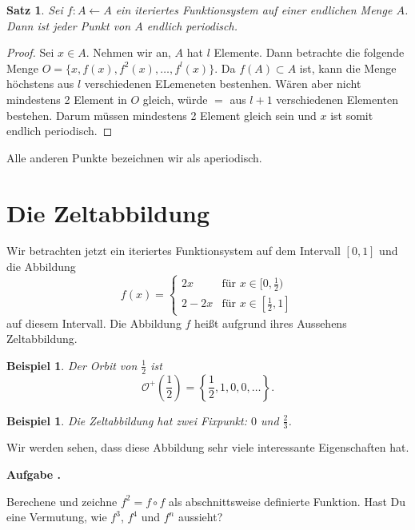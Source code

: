 \documentclass[a4paper,ngerman,12pt]{scrartcl}
\theoremstyle{definition}
\theoremstyle{plain}
\newtheorem{satz}[defn]{Satz}
\newtheorem{beispiel}[defn]{Beispiel}
\theoremstyle{remark}
\newlength{\aufgabenskip}
\newcounter{aufgabennummer}
\newenvironment{aufgabe}[1]{
  \addtocounter{aufgabennummer}{1}
  \textbf{Aufgabe \theaufgabennummer.} \emph{#1} \par
}{\vspace{\aufgabenskip}}
\begin{document}
\begin{satz}
Sei $f:A\longleftarrow A$ ein iteriertes Funktionsystem auf einer endlichen Menge $A$. Dann ist jeder Punkt von $A$ endlich periodisch.
\end{satz}
\begin{proof}
Sei $x\in A$. Nehmen wir an, $A$ hat $l$ Elemente. Dann betrachte die folgende Menge $O = \{x, f(x), f^2(x),\ldots, f^l(x)\}$. Da $f(A)\subset A$ ist, kann die Menge höchstens aus $l$ verschiedenen ELemeneten bestenhen. Wären aber nicht mindestens 2 Element in $O$ gleich, würde $=$ aus $l+1$ verschiedenen Elementen bestehen. Darum müssen mindestens 2 Element gleich sein und $x$ ist somit endlich periodisch.
\end{proof}
Alle anderen Punkte bezeichnen wir als aperiodisch.

\section{Die Zeltabbildung}
Wir betrachten jetzt ein iteriertes Funktionsystem auf dem Intervall $[0,1]$ und die Abbildung 
\[
f(x) = \begin{cases}
        2x & \text{für } x\in[0,\frac{1}{2}) \\
        2-2x & \text{für } x\in[\frac{1}{2},1]
       \end{cases} 
\]
auf diesem Intervall. Die Abbildung $f$ heißt aufgrund ihres Aussehens Zeltabbildung.
\begin{figure}
 
\end{figure}


\begin{beispiel}
Der Orbit von $\frac{1}{2}$ ist 
\[
 \mathcal{O}^+\left(\frac{1}{2}\right)=\left\{\frac{1}{2},1,0,0,\ldots \right\}.
\]
\end{beispiel}
\begin{beispiel}
Die Zeltabbildung hat zwei Fixpunkt: $0$ und $\frac{2}{3}$.
\end{beispiel}
Wir werden sehen, dass diese Abbildung sehr viele interessante Eigenschaften hat.
\begin{aufgabe}\\
Berechene und zeichne $f^2=f\circ f$ als abschnittsweise definierte Funktion. Hast Du eine Vermutung, wie $f^3$, $f^4$ und $f^n$ aussieht? 
\end{aufgabe}
\end{document}
